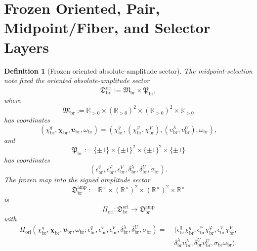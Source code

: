 \documentclass[11pt]{article}
\newcommand{\LiftSector}{\mathfrak D_{\mathrm{br}}^{\mathrm{amp}}}
\newcommand{\OriginSector}{\mathfrak D_{\mathrm{br}}^{\mathrm{ori}}}
\newcommand{\AbsAmpSector}{\mathfrak M_{\mathrm{br}}}
\newcommand{\PolaritySector}{\mathfrak P_{\mathrm{br}}}
\newcommand{\AbsReadAmp}{\chi_{\mathrm{br}}^{q}}
\newcommand{\AbsCovAmp}{\chi_{\mathrm{br}}^{\varphi}}
\newcommand{\AbsRelaxAmp}{\chi_{\mathrm{br}}^{V}}
\newcommand{\AbsKinAmp}{\bm\chi_{\mathrm{br}}}
\newcommand{\AbsWellAmp}{\upsilon_{\mathrm{br}}^{\lambda}}
\newcommand{\AbsEqAmp}{\upsilon_{\mathrm{br}}^{U}}
\newcommand{\AbsAnchorAmp}{\bm\upsilon_{\mathrm{br}}}
\newcommand{\AbsScaleAmp}{\omega_{\mathrm{br}}}
\newcommand{\PolRead}{\epsilon_{\mathrm{br}}^{q}}
\newcommand{\PolCov}{\epsilon_{\mathrm{br}}^{\varphi}}
\newcommand{\PolRelax}{\epsilon_{\mathrm{br}}^{V}}
\newcommand{\PolWell}{\delta_{\mathrm{br}}^{\lambda}}
\newcommand{\PolEq}{\delta_{\mathrm{br}}^{U}}
\newcommand{\PolScale}{\sigma_{\mathrm{br}}}
\newcommand{\OriginMap}{\Pi_{\mathrm{ori}}}
\newcommand{\Rstar}{\mathbb R^{\times}}
\newtheorem{definition}{Definition}
\begin{document}
\section{Frozen Oriented, Pair, Midpoint/Fiber, and Selector Layers}

\begin{definition}[Frozen oriented absolute-amplitude sector]
\label{def:frozenorigin}
The midpoint-selection note fixed the oriented absolute-amplitude sector
\begin{equation}
\OriginSector
:=
\AbsAmpSector\times\PolaritySector,
\label{eq:originsector}
\end{equation}
where
\begin{equation}
\AbsAmpSector
:=
\mathbb R_{>0}\times(\mathbb R_{>0})^{2}\times(\mathbb R_{>0})^{2}\times\mathbb R_{>0}
\label{eq:abssector}
\end{equation}
has coordinates
\begin{equation}
(\AbsReadAmp,\AbsKinAmp,\AbsAnchorAmp,\AbsScaleAmp)
=
(\AbsReadAmp,(\AbsCovAmp,\AbsRelaxAmp),(\AbsWellAmp,\AbsEqAmp),\AbsScaleAmp),
\label{eq:abscoords}
\end{equation}
and
\begin{equation}
\PolaritySector
:=
\{\pm1\}\times\{\pm1\}^{2}\times\{\pm1\}^{2}\times\{\pm1\}
\label{eq:polsector}
\end{equation}
has coordinates
\begin{equation}
(\PolRead,\PolCov,\PolRelax,\PolWell,\PolEq,\PolScale).
\label{eq:polcoords}
\end{equation}
The frozen map into the signed amplitude sector
\begin{equation}
\LiftSector
:=
\Rstar\times(\Rstar)^{2}\times(\Rstar)^{2}\times\Rstar
\label{eq:liftsector}
\end{equation}
is
\begin{equation}
\OriginMap:\OriginSector\longrightarrow\LiftSector
\label{eq:originmap}
\end{equation}
with
\begin{align}
\OriginMap(\AbsReadAmp,\AbsKinAmp,\AbsAnchorAmp,\AbsScaleAmp;\PolRead,\PolCov,\PolRelax,\PolWell,\PolEq,\PolScale)
=\;&
(\PolRead\AbsReadAmp,\PolCov\AbsCovAmp,\PolRelax\AbsRelaxAmp,
\nonumber\\
&\PolWell\AbsWellAmp,\PolEq\AbsEqAmp,\PolScale\AbsScaleAmp).
\label{eq:originmapexplicit}
\end{align}
\end{definition}
\end{document}
